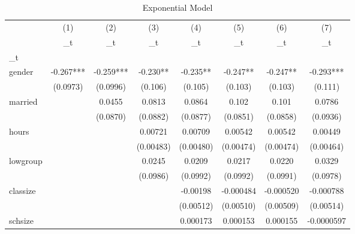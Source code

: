 \begin{table}[htbp]\centering
\def\sym#1{\ifmmode^{#1}\else\(^{#1}\)\fi}
\caption{Exponential Model}
\begin{tabular}{l*{7}{c}}
\hline\hline
            &\multicolumn{1}{c}{(1)}&\multicolumn{1}{c}{(2)}&\multicolumn{1}{c}{(3)}&\multicolumn{1}{c}{(4)}&\multicolumn{1}{c}{(5)}&\multicolumn{1}{c}{(6)}&\multicolumn{1}{c}{(7)}\\
            &\multicolumn{1}{c}{\_t}&\multicolumn{1}{c}{\_t}&\multicolumn{1}{c}{\_t}&\multicolumn{1}{c}{\_t}&\multicolumn{1}{c}{\_t}&\multicolumn{1}{c}{\_t}&\multicolumn{1}{c}{\_t}\\
\hline
\_t          &               &               &               &               &               &               &               \\
gender      &      -0.267***&      -0.259***&      -0.230** &      -0.235** &      -0.247** &      -0.247** &      -0.293***\\
            &    (0.0973)   &    (0.0996)   &     (0.106)   &     (0.105)   &     (0.103)   &     (0.103)   &     (0.111)   \\
[1em]
married     &               &      0.0455   &      0.0813   &      0.0864   &       0.102   &       0.101   &      0.0786   \\
            &               &    (0.0870)   &    (0.0882)   &    (0.0877)   &    (0.0851)   &    (0.0858)   &    (0.0936)   \\
[1em]
hours       &               &               &     0.00721   &     0.00709   &     0.00542   &     0.00542   &     0.00449   \\
            &               &               &   (0.00483)   &   (0.00480)   &   (0.00474)   &   (0.00474)   &   (0.00464)   \\
[1em]
lowgroup    &               &               &      0.0245   &      0.0209   &      0.0217   &      0.0220   &      0.0329   \\
            &               &               &    (0.0986)   &    (0.0992)   &    (0.0992)   &    (0.0991)   &    (0.0978)   \\
[1em]
classize    &               &               &               &    -0.00198   &   -0.000484   &   -0.000520   &   -0.000788   \\
            &               &               &               &   (0.00512)   &   (0.00510)   &   (0.00509)   &   (0.00514)   \\
[1em]
schsize     &               &               &               &    0.000173   &    0.000153   &    0.000155   &  -0.0000597   \\

\end{tabular}
\end{table}
